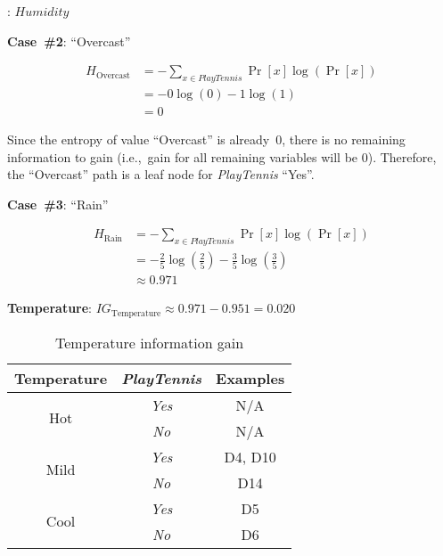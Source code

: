 \begin{center}
  \textbf{}: $\boxed{Humidity}$
\end{center}

\noindent
{\large \textbf{Case~\#2}: ``Overcast''}

\begin{align*}
  H_{\text{Overcast}} &= -\sum_{x\in PlayTennis} \Pr[x] \log \left(\Pr[x] \right)\\
                      &= - 0 \log(0) - 1 \log(1) \\
                      &= 0
\end{align*}

Since the entropy of value ``Overcast'' is already~0, there is no remaining information to gain (i.e.,~gain for all remaining variables will be 0).  Therefore, the ``Overcast'' path is a leaf node for \textit{PlayTennis} ``Yes''.

\noindent
{\large \textbf{Case~\#3}: ``Rain''}

\begin{align*}
  H_{\text{Rain}} &= -\sum_{x\in PlayTennis} \Pr[x] \log \left(\Pr[x]\right) \\
                  &= - \frac{2}{5} \log\left(\frac{2}{5}\right) - \frac{3}{5} \log\left(\frac{3}{5}\right) \\
                  &\approx 0.971
\end{align*}

\noindent
\textbf{Temperature}: $IG_{\text{Temperature}} \approx 0.971 - 0.951 = \boxed{0.020}$

  \begin{table}[h]
    \centering
    \caption{Temperature information gain}
    \begin{tabular}{c|c|c}
      \hline
      Temperature  & \textit{PlayTennis} & Examples \\\hline\hline
      \multirow{2}{*}{Hot}  & \textit{Yes} & N/A \\
                            & \textit{No}  & N/A \\\hline
      \multirow{2}{*}{Mild} & \textit{Yes} & D4, D10 \\
                            & \textit{No}  & D14 \\\hline
      \multirow{2}{*}{Cool} & \textit{Yes} & D5 \\
                            & \textit{No}  & D6 \\\hline
    \end{tabular}
  \end{table}

